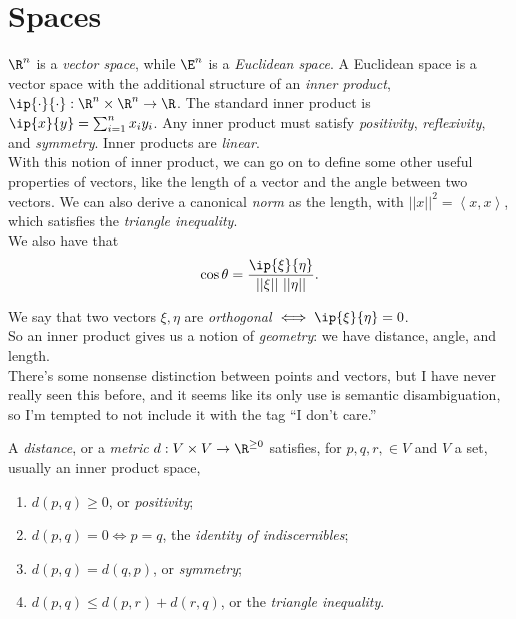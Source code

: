 \documentclass{notes}
\begin{document}
\section{Spaces}
$\R^n$ is a \emph{vector space}, while $\E^n$ is a \emph{Euclidean space}. A Euclidean space is a 
vector space with the additional structure of an \emph{inner product}, $\ip{\cdot}{\cdot}:
\R^n\times\R^n\to\R$. The standard inner product is $\ip{x}{y} = \sum_{i=1}^n x_iy_i$. Any 
inner product must satisfy \emph{positivity}, \emph{reflexivity}, and \emph{symmetry}. Inner products
are \emph{linear}. \\

With this notion of inner product, we can go on to define some other useful properties of vectors,
like the length of a vector and the angle between two vectors. We can also derive a canonical \emph{norm}
as the length, with $||x||^2 = \left<x,x\right>$, which satisfies the \emph{triangle inequality}. \\

We also have that $$\cos\theta = \frac{\ip{\xi}{\eta}}{||\xi||\ ||\eta||}.$$

We say that two vectors $\xi, \eta$ are \emph{orthogonal} $\iff \ip{\xi}{\eta} = 0$. \\

So an inner product gives us a notion of \emph{geometry}: we have distance, angle, and length. \\

There's some nonsense distinction between points and vectors, but I have never
really seen this before, and it seems like its only use is semantic disambiguation, so I'm tempted
to not include it with the tag ``I don't care.'' %

\begin{defn}
  A \emph{distance}, or a \emph{metric} $d: V \times V \to \R^{\geq 0}$ satisfies, for $p,q,r,\in V$
  and $V$ a set, usually an inner product space,
  \begin{enumerate}
    \item $d(p,q) \geq 0$, or \emph{positivity};
    \item $d(p,q) = 0 \iff p = q$, the \emph{identity of indiscernibles};
    \item $d(p,q) = d(q,p)$, or \emph{symmetry};
    \item $d(p,q) \leq d(p,r) + d(r,q)$, or the \emph{triangle inequality}.
  \end{enumerate}
\end{defn}
\end{document}
